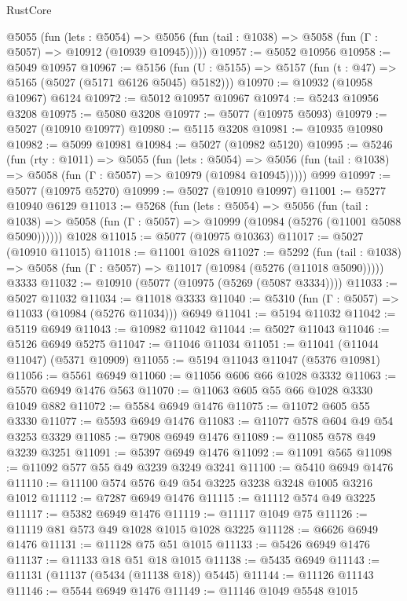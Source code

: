 \begin{lexlean}{RustCore}
\begin{coremodule}
    @5055
      (fun (lets : @5054) =>
      @5056 (fun (tail : @1038) => @5058 (fun (Γ : @5057) => @10912 (@10939 @10945)))))
@10957 := @5052 @10956
@10958 := @5049 @10957
@10967 := @5156
    (fun (U : @5155) => @5157 (fun (t : @47) => @5165 (@5027 (@5171 @6126 @5045) @5182)))
@10970 := @10932 (@10958 @10967) @6124
@10972 := @5012 @10957 @10967
@10974 := @5243 @10956 @3208
@10975 := @5080 @3208
@10977 := @5077 (@10975 @5093)
@10979 := @5027 (@10910 @10977)
@10980 := @5115 @3208
@10981 := @10935 @10980
@10982 := @5099 @10981
@10984 := @5027 (@10982 @5120)
@10995 := @5246
    (fun (rty : @1011) =>
    @5055
      (fun (lets : @5054) =>
      @5056 (fun (tail : @1038) => @5058 (fun (Γ : @5057) => @10979 (@10984 @10945)))))
    @999
@10997 := @5077 (@10975 @5270)
@10999 := @5027 (@10910 @10997)
@11001 := @5277 @10940 @6129
@11013 := @5268
    (fun (lets : @5054) =>
    @5056
      (fun (tail : @1038) =>
      @5058 (fun (Γ : @5057) => @10999 (@10984 (@5276 (@11001 @5088 @5090))))))
    @1028
@11015 := @5077 (@10975 @10363)
@11017 := @5027 (@10910 @11015)
@11018 := @11001 @1028
@11027 := @5292
    (fun (tail : @1038) => @5058 (fun (Γ : @5057) => @11017 (@10984 (@5276 (@11018 @5090)))))
    @3333
@11032 := @10910 (@5077 (@10975 (@5269 (@5087 @3334))))
@11033 := @5027 @11032
@11034 := @11018 @3333
@11040 := @5310 (fun (Γ : @5057) => @11033 (@10984 (@5276 @11034))) @6949
@11041 := @5194 @11032
@11042 := @5119 @6949
@11043 := @10982 @11042
@11044 := @5027 @11043
@11046 := @5126 @6949 @5275
@11047 := @11046 @11034
@11051 := @11041 (@11044 @11047) (@5371 @10909)
@11055 := @5194 @11043 @11047 (@5376 @10981)
@11056 := @5561 @6949
@11060 := @11056 @606 @66 @1028 @3332
@11063 := @5570 @6949 @1476 @563
@11070 := @11063 @605 @55 @66 @1028 @3330 @1049 @882
@11072 := @5584 @6949 @1476
@11075 := @11072 @605 @55 @3330
@11077 := @5593 @6949 @1476
@11083 := @11077 @578 @604 @49 @54 @3253 @3329
@11085 := @7908 @6949 @1476
@11089 := @11085 @578 @49 @3239 @3251
@11091 := @5397 @6949 @1476
@11092 := @11091 @565
@11098 := @11092 @577 @55 @49 @3239 @3249 @3241
@11100 := @5410 @6949 @1476
@11110 := @11100 @574 @576 @49 @54 @3225 @3238 @3248 @1005 @3216 @1012
@11112 := @7287 @6949 @1476
@11115 := @11112 @574 @49 @3225
@11117 := @5382 @6949 @1476
@11119 := @11117 @1049 @75
@11126 := @11119 @81 @573 @49 @1028 @1015 @1028 @3225
@11128 := @6626 @6949 @1476
@11131 := @11128 @75 @51 @1015
@11133 := @5426 @6949 @1476
@11137 := @11133 @18 @51 @18 @1015
@11138 := @5435 @6949
@11143 := @11131 (@11137 (@5434 (@11138 @18)) @5445)
@11144 := @11126 @11143
@11146 := @5544 @6949 @1476
@11149 := @11146 @1049 @5548 @1015

\end{coremodule}
\end{lexlean}
